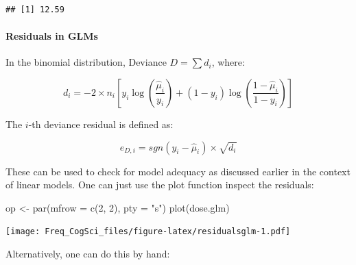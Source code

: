 \documentclass[
  12pt,
]{krantz}
\newenvironment{Shaded}{\begin{snugshade}}{\end{snugshade}}
\newcommand{\AttributeTok}[1]{\textcolor[rgb]{0.77,0.63,0.00}{#1}}
\newcommand{\DecValTok}[1]{\textcolor[rgb]{0.00,0.00,0.81}{#1}}
\newcommand{\FunctionTok}[1]{\textcolor[rgb]{0.00,0.00,0.00}{#1}}
\newcommand{\NormalTok}[1]{#1}
\newcommand{\OtherTok}[1]{\textcolor[rgb]{0.56,0.35,0.01}{#1}}
\newcommand{\StringTok}[1]{\textcolor[rgb]{0.31,0.60,0.02}{#1}}
\theoremstyle{definition}
\theoremstyle{definition}
\theoremstyle{definition}
\theoremstyle{definition}
\theoremstyle{remark}
\begin{document}
\begin{verbatim}
## [1] 12.59
\end{verbatim}

\hypertarget{residuals-in-glms}{%
\paragraph{Residuals in GLMs}\label{residuals-in-glms}}

In the binomial distribution, Deviance \(D=\sum d_i\), where:

\begin{equation}
d_i = -2 \times n_i [ y_i \log(\frac{\hat{\mu}_i}{y_i}) + (1-y_i) \log (\frac{1-\hat{\mu}_i}{1-y_i}) ]  
\end{equation}

The \(i\)-th deviance residual is defined as:

\begin{equation}
  e_{D,i}= sgn(y_i-\hat{\mu}_i) \times \sqrt{d_i}
\end{equation}

These can be used to check for model adequacy as discussed earlier in the context of linear models.
One can just use the plot function inspect the residuals:

\begin{Shaded}
\begin{Highlighting}[]
\NormalTok{op }\OtherTok{\textless{}{-}} \FunctionTok{par}\NormalTok{(}\AttributeTok{mfrow =} \FunctionTok{c}\NormalTok{(}\DecValTok{2}\NormalTok{, }\DecValTok{2}\NormalTok{), }\AttributeTok{pty =} \StringTok{"s"}\NormalTok{)}
\FunctionTok{plot}\NormalTok{(dose.glm)}
\end{Highlighting}
\end{Shaded}

\texttt{[image: Freq\_CogSci\_files/figure-latex/residualsglm-1.pdf]}

Alternatively, one can do this by hand:
\end{document}
